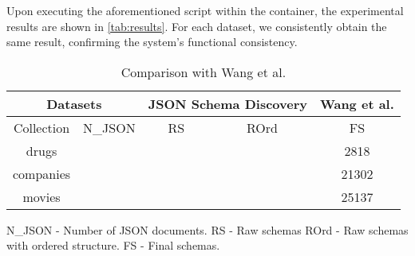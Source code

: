 \documentclass[sigconf, nonacm]{acmart}
\begin{document}
Upon executing the aforementioned script within the container, the experimental results are shown in \autoref{tab:results}. For each dataset, we consistently obtain the same result, confirming the system’s functional consistency.

\begin{table}[hb]%
	\centering
	\caption{Comparison with Wang et al.}
	\label{tab:results}
	\begin{tabular}{|c|c|c|c|c|}
		\hline
		\multicolumn{2}{|c|}{Datasets} & \multicolumn{2}{c|}{JSON Schema Discovery} & Wang et al.                 \\
		\hline
		Collection                     & N\_JSON                                    & RS          & ROrd  & FS    \\
		\hline
		drugs                          & \drugsCount                                       & \drugsUnordered        & \drugsOrdered  & 2818  \\
		\hline
		companies                      & \companiesCount                                      & \companiesUnordered       & \companiesOrdered & 21302 \\
		\hline
		movies                         & \moviesCount                                      & \moviesUnordered       & \moviesOrdered & 25137 \\
		\hline
	\end{tabular}
	\parbox{0.4\textwidth}{
		\raggedright\footnotesize
		N\_JSON - Number of JSON documents. RS - Raw schemas \newline
		ROrd - Raw schemas with ordered structure. FS - Final schemas.
	}
\end{table}




\end{document}
